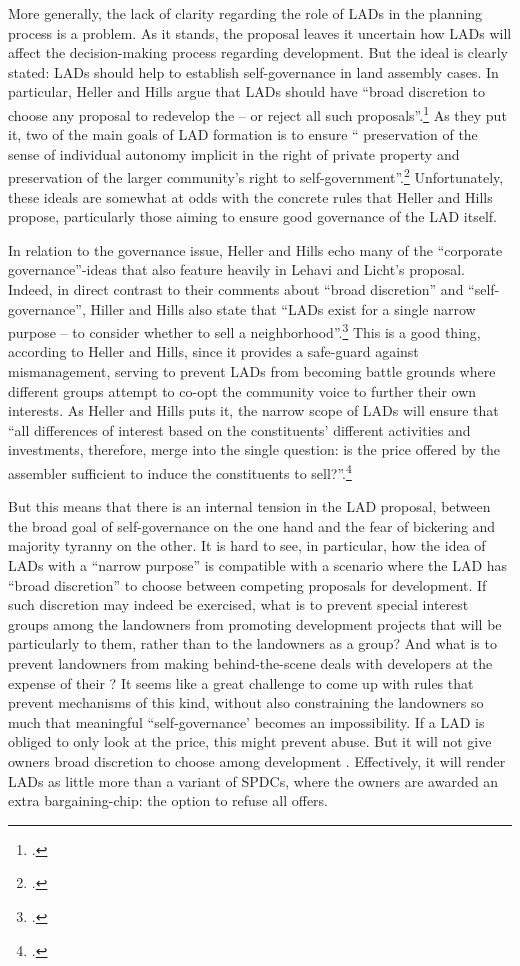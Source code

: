 More generally, the lack of clarity regarding the role of LADs in the planning process is a problem. As it stands, the proposal leaves it uncertain how LADs will affect the decision-making process regarding development. But the ideal is clearly stated: LADs should help to establish self-governance in land assembly cases. In particular, Heller and Hills argue that LADs should have ``broad discretion to choose any proposal to redevelop the  -- or reject all such proposals''.\footcite[See][1496]{heller08} As they put it, two of the main goals of LAD formation is to ensure `` preservation of the sense of individual autonomy implicit in the right of private property and preservation of the larger community's right to self-government''.\footcite[See][1498]{heller08} Unfortunately, these ideals are somewhat at odds with the concrete rules that Heller and Hills propose, particularly those aiming to ensure good governance of the LAD itself. 

In relation to the governance issue, Heller and Hills echo many of the ``corporate governance''-ideas that also feature heavily in Lehavi and Licht's proposal. Indeed, in direct contrast to their comments about ``broad discretion'' and ``self-governance'', Hiller and Hills also state that ``LADs exist for a single narrow purpose -- to consider whether to sell a neighborhood''.\footcite[See][1500]{heller08} This is a good thing, according to Heller and Hills, since it provides a safe-guard against mismanagement, serving to prevent LADs from becoming battle grounds where different groups attempt to co-opt the community voice to further their own interests. As Heller and Hills puts it, the narrow scope of LADs will ensure that ``all differences of interest based on the constituents' different activities and investments, therefore, merge into the single question: is the price offered by the assembler sufficient to induce the constituents to sell?''.\footcite[1500]{heller08}

But this means that there is an internal tension in the LAD proposal, between the broad goal of self-governance on the one hand and the fear of  bickering and majority tyranny on the other. It is hard to see, in particular, how the idea of LADs with a ``narrow purpose'' is compatible with a scenario where the LAD has ``broad discretion'' to choose between competing proposals for development. If such discretion may indeed be exercised, what is to prevent special interest groups among the landowners from promoting development projects that will be particularly  to them, rather than to the landowners as a group? And what is to prevent landowners from making behind-the-scene deals with  developers at the expense of their ? It seems like a great challenge to come up with rules that prevent mechanisms of this kind, without also constraining the landowners so much that meaningful ``self-governance' becomes an impossibility. If a LAD is obliged to only look at the price, this might prevent abuse. But it will not give owners broad discretion to choose among development . Effectively, it will render LADs as little more than a variant of SPDCs, where the owners are awarded an extra bargaining-chip: the option to refuse all offers. 


